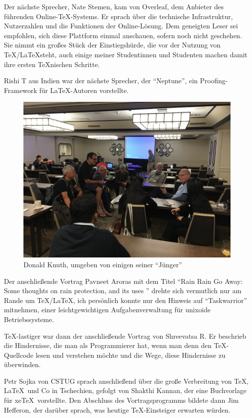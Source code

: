 \documentclass[ngerman]{dtk}
\begin{document}
Der nächste Sprecher, Nate Stemen, kam von Overleaf, dem Anbieter des führenden Online-\TeX-Systems. Er sprach über die technische Infrastruktur, Nutzerzahlen und die Funktionen der Online-Lösung. Dem geneigten Leser sei empfohlen, sich diese Plattform einmal anschauen, sofern noch nicht geschehen. Sie nimmt ein großes Stück der Einstiegshürde, die vor der Nutzung von \TeX/\LaTeX steht, auch einige meiner Studentinnen und Studenten machen damit ihre ersten \TeX nischen Schritte.

Rishi T aus Indien war der nächste Sprecher, der \enquote{Neptune}, ein Proofing-Framework für \LaTeX-Autoren vorstellte. 

\begin{figure}
\includegraphics[width=\textwidth]{Juenger}
\caption{Donald Knuth, umgeben von einigen seiner \enquote{Jünger}}
\end{figure}

Der anschließende Vortrag Pavneet Aroras mit dem Titel \enquote{Rain Rain Go Away: Some thoughts on rain protection, and its uses } drehte sich vermutlich nur am Rande um \TeX/\LaTeX, ich persönlich konnte nur den Hinweis auf \enquote{Taskwarrior} mitnehmen, einer leichtgewichtigen Aufgabenverwaltung für unixoide Betriebssysteme.

\TeX-lastiger war dann der anschließende Vortrag von Shreevatsa R. Er beschrieb die Hindernisse, die man als Programmierer hat, wenn man denn den \TeX-Quellcode lesen und verstehen möchte und die Wege, diese Hindernisse zu überwinden.

Petr Sojka von CSTUG sprach anschließend über die große Verbreitung von \TeX, \LaTeX\ und Co in Tschechien, gefolgt von Shakthi Kannan, der eine Buchvorlage für xe\TeX\ vorstellte. Den Abschluss des Vortragsprogramms bildete dann Jim Hefferon, der darüber sprach, was heutige \TeX-Einsteiger erwarten würden.
\end{document}
